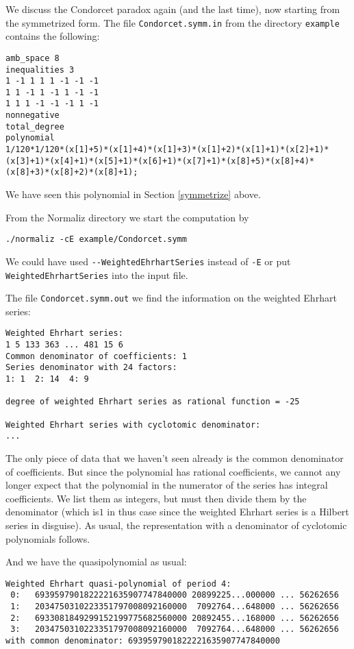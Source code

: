 \documentclass[12pt,a4paper]{scrartcl}
\theoremstyle{definition}
\def\ttt{\texttt}
\begin{document}
{We discuss the Condorcet paradox again (and the last time), now starting from the symmetrized form. The file \ttt{Condorcet.symm.in} from the directory
\ttt{example} contains the following:

\begin{Verbatim}
amb_space 8
inequalities 3
1 -1 1 1 1 -1 -1 -1
1 1 -1 1 -1 1 -1 -1
1 1 1 -1 -1 -1 1 -1
nonnegative
total_degree
polynomial
1/120*1/120*(x[1]+5)*(x[1]+4)*(x[1]+3)*(x[1]+2)*(x[1]+1)*(x[2]+1)*
(x[3]+1)*(x[4]+1)*(x[5]+1)*(x[6]+1)*(x[7]+1)*(x[8]+5)*(x[8]+4)*
(x[8]+3)*(x[8]+2)*(x[8]+1);
\end{Verbatim}
We have seen this polynomial in Section \ref{symmetrize} above.


From the Normaliz directory we start the computation by
\begin{Verbatim}
./normaliz -cE example/Condorcet.symm
\end{Verbatim}
We could have used \verb|--WeightedEhrhartSeries| instead of \verb|-E| or put \verb|WeightedEhrhartSeries| into the input file.

The file \ttt{Condorcet.symm.out} we find the information on the weighted Ehrhart series:

\begin{Verbatim}
Weighted Ehrhart series:
1 5 133 363 ... 481 15 6
Common denominator of coefficients: 1
Series denominator with 24 factors:
1: 1  2: 14  4: 9

degree of weighted Ehrhart series as rational function = -25

Weighted Ehrhart series with cyclotomic denominator:
...
\end{Verbatim}
The only piece of data that we haven't seen already is the common denominator of coefficients. But since the polynomial has rational coefficients, we cannot any longer expect that the polynomial in the numerator of the series has integral coefficients. We list them as integers, but must then divide them by the denominator (which is$1$ in thus case since the weighted Ehrhart series is a Hilbert series in disguise). As usual, the representation with a denominator of cyclotomic polynomials follows.

And we have the quasipolynomial as usual:

\begin{Verbatim}
Weighted Ehrhart quasi-polynomial of period 4:
 0:   6939597901822221635907747840000 20899225...000000 ... 56262656
 1:   2034750310223351797008092160000  7092764...648000 ... 56262656
 2:   6933081849299152199775682560000 20892455...168000 ... 56262656
 3:   2034750310223351797008092160000  7092764...648000 ... 56262656
with common denominator: 6939597901822221635907747840000
\end{Verbatim}

}
\end{document}

